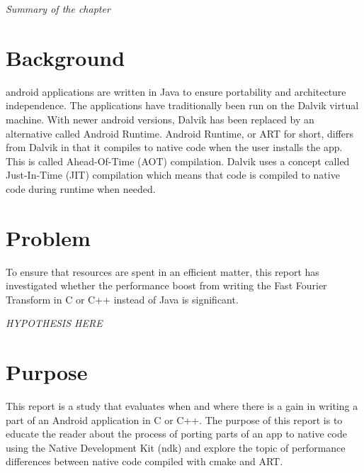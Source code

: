 \textit{Summary of the chapter}


\section{Background}
\gls{android} applications are written in Java to ensure portability and architecture independence. The applications have traditionally been run on the Dalvik virtual machine. With newer android versions, Dalvik has been replaced by an alternative called Android Runtime. Android Runtime, or ART for short, differs from Dalvik in that it compiles to native code when the user installs the app. This is called Ahead-Of-Time (AOT) compilation. Dalvik uses a concept called Just-In-Time (JIT) compilation which means that code is compiled to native code during runtime when needed.

\section{Problem}
To ensure that resources are spent in an efficient matter, this report has investigated whether the performance boost from writing the Fast Fourier Transform in C or C++ instead of Java is significant.

\begin{center}
    \textit{HYPOTHESIS HERE}
\end{center}


\section{Purpose}
This report is a study that evaluates when and where there is a gain in writing a part of an Android application in C or C++. The purpose of this report is to educate the reader about the process of porting parts of an app to native code using the Native Development Kit (\gls{ndk}) and explore the topic of performance differences between native code compiled with \gls{cmake} and ART.

